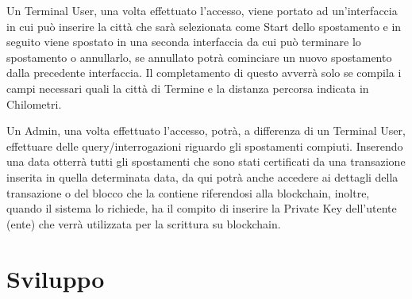 \documentclass[11pt,a4paper,titlepage, twoside, openright]{report}
\begin{document}
Un Terminal User, una volta effettuato l'accesso, viene portato ad un'interfaccia in cui può inserire la città che sarà selezionata come Start dello spostamento e in seguito viene spostato in una seconda interfaccia da cui può terminare lo spostamento o annullarlo, se annullato potrà cominciare un nuovo spostamento dalla precedente interfaccia. Il completamento di questo avverrà solo se compila i campi necessari quali la città di Termine e la distanza percorsa indicata in Chilometri.

Un Admin, una volta effettuato l'accesso, potrà, a differenza di un Terminal User, effettuare delle query/interrogazioni riguardo gli spostamenti compiuti. Inserendo una data otterrà tutti gli spostamenti che sono stati certificati da una transazione inserita in quella determinata data, da qui potrà anche accedere ai dettagli della transazione o del blocco che la contiene riferendosi alla blockchain, inoltre, quando il sistema lo richiede, ha il compito di inserire la Private Key dell'utente (ente) che verrà utilizzata per la scrittura su blockchain.

\chapter{Sviluppo}
\end{document}
